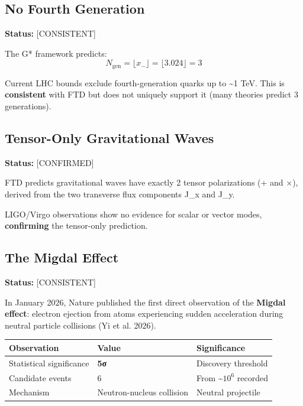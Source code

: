 \documentclass[
  11pt,
  letterpaper,
  twoside,
  openright]{book}
\begin{document}
\subsection{No Fourth Generation}\label{no-fourth-generation}

\textbf{Status:} {[}CONSISTENT{]}

The G* framework predicts:
\[N_{\text{gen}} = \lfloor x_- \rfloor = \lfloor 3.024 \rfloor = 3\]

Current LHC bounds exclude fourth-generation quarks up to
\textasciitilde1 TeV. This is \textbf{consistent} with FTD but does not
uniquely support it (many theories predict 3 generations).

\subsection{Tensor-Only Gravitational
Waves}\label{tensor-only-gravitational-waves}

\textbf{Status:} {[}CONFIRMED{]}

FTD predicts gravitational waves have exactly 2 tensor polarizations (+
and ×), derived from the two transverse flux components J\_x and J\_y.

LIGO/Virgo observations show no evidence for scalar or vector modes,
\textbf{confirming} the tensor-only prediction.

\subsection{The Migdal Effect}\label{the-migdal-effect}

\textbf{Status:} {[}CONSISTENT{]}

In January 2026, Nature published the first direct observation of the
\textbf{Migdal effect}: electron ejection from atoms experiencing sudden
acceleration during neutral particle collisions (Yi et al. 2026).

\begin{longtable}[]{@{}lll@{}}
\toprule\noalign{}
Observation & Value & Significance \\
\midrule\noalign{}
\endhead
\bottomrule\noalign{}
\endlastfoot
Statistical significance & \textbf{5σ} & Discovery threshold \\
Candidate events & 6 & From \textasciitilde{}\(10^6\) recorded \\
Mechanism & Neutron-nucleus collision & Neutral projectile \\
\end{longtable}
\end{document}

